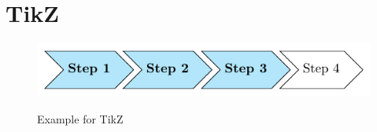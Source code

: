 
\chapter{TikZ}

\begin{figure}[htb]
	\center
	\includegraphics{figures/tikz-example/arrows.pdf}
	\label{tikz-example}
	\caption{Example for TikZ}
\end{figure}